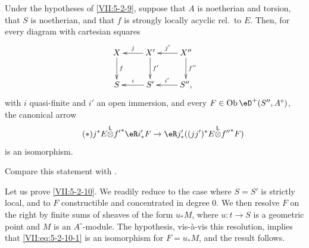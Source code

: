 \begin{proposition}\label{VII:5-2-10}
Under the hypotheses of \ref{VII:5-2-9}, suppose that $A$ is noetherian and
torsion, that $S$ is noetherian, and that $f$ is strongly locally acyclic
rel.\ to $E$. Then, for every diagram with cartesian squares
\[\xymatrix{
  X \ar[d]^-f 
    & \ar[l]_-j X' \ar[d]^-{f'} 
    & \ar[l]_-{j'} X'' \ar[d]^-{f''} \\
  S 
    & \ar[l]_-i S' 
    & \ar[l]_-{i'} S'' \text{,} 
}\]
with $i$ quasi-finite and $i'$ an open immersion, and every
$F\in\ob\eD^+(S'',A^\circ)$, the canonical arrow
\begin{equation*}\tag{$*$}\label{VII:eq:5-2-10-1}
  j^\ast E \lotimes {f'}^\ast \eR i'_\ast F \to \eR j'_\ast ((j j')^\ast E\lotimes {f''}^\ast F) 
\end{equation*}
is an isomorphism.
\end{proposition}

Compare this statement with \cite[XV 1.17]{sga4}.

Let us prove \ref{VII:5-2-10}. We readily reduce to the case where $S=S'$ is
strictly local, and to $F$ constructible and concentrated in degree $0$. We then
resolve $F$ on the right by finite sums of sheaves of the form $u_\ast M$,
where $u:t\to S$ is a geometric point and $M$ is an $A^\circ$-module. The
hypothesis, vis-\`a-vis this resolution, implies that
\eqref{VII:eq:5-2-10-1} is an isomorphism for $F=u_\ast M$, and the result
follows.
